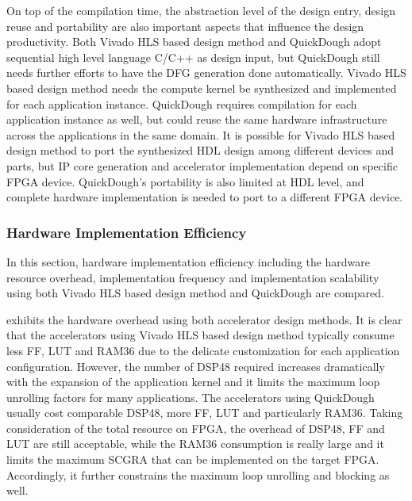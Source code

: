 On top of the compilation time, the abstraction level of the design entry, design reuse and portability are also important aspects that influence the design productivity. Both Vivado HLS based design method and QuickDough adopt sequential high level language C/C++ as design input, but QuickDough still needs further efforts to have the DFG generation done automatically. Vivado HLS based design method needs the compute kernel be synthesized and implemented for each application instance. QuickDough requires compilation for each application instance as well, but could reuse the same hardware infrastructure across the applications in the same domain. It is possible for Vivado HLS based design method to port the synthesized HDL design among different devices and parts, but IP core generation and accelerator implementation depend on specific FPGA device. QuickDough's portability is also limited at HDL level, and complete hardware implementation is needed to port to a different FPGA device.

\subsubsection{Hardware Implementation Efficiency}
In this section, hardware implementation efficiency including the hardware resource overhead, implementation frequency and implementation scalability using both Vivado HLS based design method and QuickDough are compared. 

 exhibits the hardware overhead using both accelerator design methods. It is clear that the accelerators using Vivado HLS based design method typically consume less FF, LUT and RAM36 due to the delicate customization for each application configuration. However, the number of DSP48 required increases dramatically with the expansion of the application kernel and it limits the maximum loop unrolling factors for many applications. The accelerators using QuickDough usually cost comparable DSP48, more FF, LUT and particularly RAM36. Taking consideration of the total resource on FPGA, the overhead of DSP48, FF and LUT are still acceptable, while the RAM36 consumption is really large and it limits the maximum SCGRA that can be implemented on the target FPGA. Accordingly, it further constrains the maximum loop unrolling and blocking as well.

